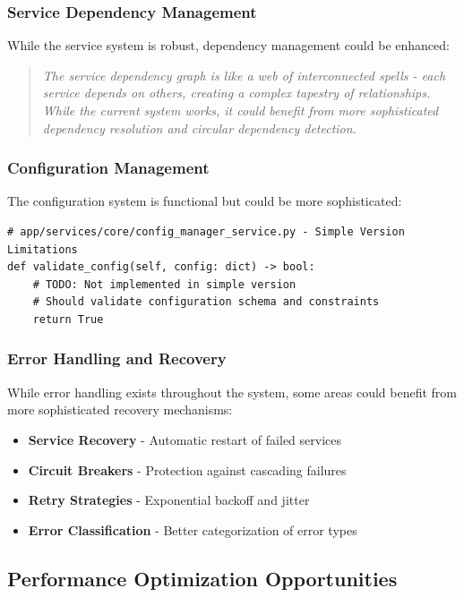 \documentclass[11pt]{article}
\begin{document}
\subsubsection{Service Dependency Management}

While the service system is robust, dependency management could be enhanced:

\begin{quote}
\emph{The service dependency graph is like a web of interconnected spells - each service depends on others, creating a complex tapestry of relationships. While the current system works, it could benefit from more sophisticated dependency resolution and circular dependency detection.}
\end{quote}

\subsubsection{Configuration Management}

The configuration system is functional but could be more sophisticated:

\begin{lstlisting}[style=python]
# app/services/core/config_manager_service.py - Simple Version Limitations
def validate_config(self, config: dict) -> bool:
    # TODO: Not implemented in simple version
    # Should validate configuration schema and constraints
    return True
\end{lstlisting}

\subsubsection{Error Handling and Recovery}

While error handling exists throughout the system, some areas could benefit from more sophisticated recovery mechanisms:

\begin{itemize}
\item \textbf{Service Recovery} - Automatic restart of failed services
\item \textbf{Circuit Breakers} - Protection against cascading failures
\item \textbf{Retry Strategies} - Exponential backoff and jitter
\item \textbf{Error Classification} - Better categorization of error types
\end{itemize}

\subsection{Performance Optimization Opportunities}
\end{document}
